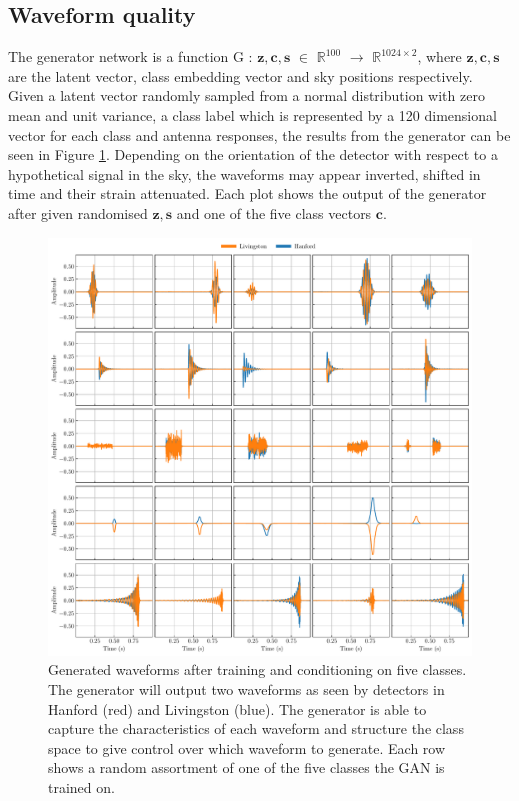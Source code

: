 \documentclass[12pt]{iopart}
\begin{document}
\subsection{Waveform quality}
The generator network is a function G : $\mathbf{z},\mathbf{c},\mathbb{\textbf{s}}$ $\in$ $\mathbb{R}^{100}$ $\to$ $\mathbb{R}^{1024\times2}$, where $\mathbf{z},\mathbf{c},\mathbb{\textbf{s}}$ are the latent vector, class embedding vector and sky positions respectively. Given a latent vector randomly sampled from a normal distribution with zero mean and unit variance, a class label which is represented by a 120 dimensional vector for each class and antenna responses, the results from the generator can be seen in Figure \ref{fig:gen_signals}. Depending on the orientation of the detector with respect to a hypothetical signal in the sky, the waveforms may appear inverted, shifted in time and their strain attenuated. Each plot shows the output of the generator after given randomised $\mathbf{z}, \mathbb{\textbf{s}}$ and one of the five class vectors $\mathbf{c}$.

\begin{figure}[ht]
    \centering
    \includegraphics[width=\textwidth]{figures/conditional_gens.pdf}
    \caption{Generated waveforms after training and conditioning on five classes. The generator will output two waveforms as seen by detectors in Hanford (red) and Livingston (blue). The generator is able to capture the characteristics of each waveform and structure the class space to give control over which waveform to generate. Each row shows a random assortment of one of the five classes the GAN is trained on. }
    \label{fig:gen_signals}
\end{figure}
\end{document}
